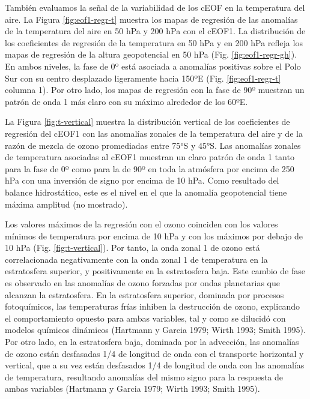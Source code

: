 \documentclass[12pt,oneside,a4paper]{reedthesis}
\begin{document}
También evaluamos la señal de la variabilidad de los cEOF en la temperatura del aire.
La Figura \ref{fig:eof1-regr-t} muestra los mapas de regresión de las anomalías de la temperatura del aire en 50 hPa y 200 hPa con el cEOF1.
La distribución de los coeficientes de regresión de la temperatura en 50 hPa y en 200 hPa refleja los mapas de regresión de la altura geopotencial en 50 hPa (Fig. \ref{fig:eof1-regr-gh}).
En ambos niveles, la fase de 0º está asociada a anomalías positivas sobre el Polo Sur con su centro desplazado ligeramente hacia 150ºE (Fig. \ref{fig:eof1-regr-t} columna 1).
Por otro lado, los mapas de regresión con la fase de 90º muestran un patrón de onda 1 más claro con su máximo alrededor de los 60ºE.

La Figura \ref{fig:t-vertical} muestra la distribución vertical de los coeficientes de regresión del cEOF1 con las anomalías zonales de la temperatura del aire y de la razón de mezcla de ozono promediadas entre 75°S y 45°S.
Las anomalías zonales de temperatura asociadas al cEOF1 muestran un claro patrón de onda 1 tanto para la fase de 0º como para la de 90º en toda la atmósfera por encima de 250 hPa con una inversión de signo por encima de 10 hPa.
Como resultado del balance hidrostático, este es el nivel en el que la anomalía geopotencial tiene máxima amplitud (no mostrado).

Los valores máximos de la regresión con el ozono coinciden con los valores mínimos de temperatura por encima de 10 hPa y con los máximos por debajo de 10 hPa (Fig. \ref{fig:t-vertical}).
Por tanto, la onda zonal 1 de ozono está correlacionada negativamente con la onda zonal 1 de temperatura en la estratosfera superior, y positivamente en la estratosfera baja.
Este cambio de fase es observado en las anomalías de ozono forzadas por ondas planetarias que alcanzan la estratosfera.
En la estratosfera superior, dominada por procesos fotoquímicos, las temperaturas frías inhiben la destrucción de ozono, explicando el comportamiento opuesto para ambas variables, tal y como se dilucidó con modelos químicos dinámicos (Hartmann y Garcia 1979; Wirth 1993; Smith 1995).
Por otro lado, en la estratosfera baja, dominada por la advección, las anomalías de ozono están desfasadas 1/4 de longitud de onda con el transporte horizontal y vertical, que a su vez están desfasados 1/4 de longitud de onda con las anomalías de temperatura, resultando anomalías del mismo signo para la respuesta de ambas variables (Hartmann y Garcia 1979; Wirth 1993; Smith 1995).
\end{document}
